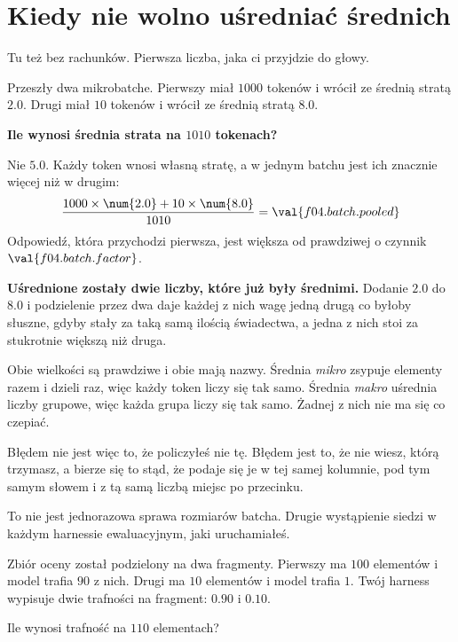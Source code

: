 \section{Kiedy nie wolno uśredniać średnich}
\label{sec:F04-averages}

\begin{fr}
Tu też bez rachunków. Pierwsza liczba, jaka ci przyjdzie do głowy.

Przeszły dwa mikrobatche. Pierwszy miał $1000$ tokenów i wrócił ze średnią
stratą $\num{2.0}$. Drugi miał $10$ tokenów i wrócił ze średnią stratą
$\num{8.0}$.

\textbf{Ile wynosi średnia strata na $1010$ tokenach?}
\dotline
\nextframe
\end{fr}

\begin{fr}
Nie $\num{5.0}$. Każdy token wnosi własną stratę, a w jednym batchu jest ich
znacznie więcej niż w drugim:
\[ \frac{1000 \times \num{2.0} + 10 \times \num{8.0}}{1010}
   = \val{f04.batch.pooled} \]
Odpowiedź, która przychodzi pierwsza, jest większa od prawdziwej o czynnik
$\val{f04.batch.factor}$.

\begin{trapbox}
\textbf{Uśrednione zostały dwie liczby, które już były średnimi.} Dodanie
$\num{2.0}$ do $\num{8.0}$ i podzielenie przez dwa daje każdej z nich wagę
jedną drugą \dash{} co byłoby słuszne, gdyby stały za taką samą ilością
świadectwa, a jedna z nich stoi za stukrotnie większą niż druga.

Obie wielkości są prawdziwe i obie mają nazwy. Średnia \emph{mikro} zsypuje
elementy razem i dzieli raz, więc każdy token liczy się tak samo. Średnia
\emph{makro} uśrednia liczby grupowe, więc każda grupa liczy się tak samo.
Żadnej z nich nie ma się co czepiać.

Błędem nie jest więc to, że policzyłeś nie tę. Błędem jest to, że nie wiesz,
którą trzymasz, a bierze się to stąd, że podaje się je w tej samej kolumnie,
pod tym samym słowem i z tą samą liczbą miejsc po przecinku.
\end{trapbox}
\end{fr}

\begin{fr}
To nie jest jednorazowa sprawa rozmiarów batcha. Drugie wystąpienie siedzi w
każdym harnessie ewaluacyjnym, jaki uruchamiałeś.

Zbiór oceny został podzielony na dwa fragmenty. Pierwszy ma $100$ elementów i
model trafia $90$ z nich. Drugi ma $10$ elementów i model trafia $1$. Twój
harness wypisuje dwie trafności na fragment: $\num{0.90}$ i $\num{0.10}$.

Ile wynosi trafność na $110$ elementach?
\nextframe
\end{fr}

